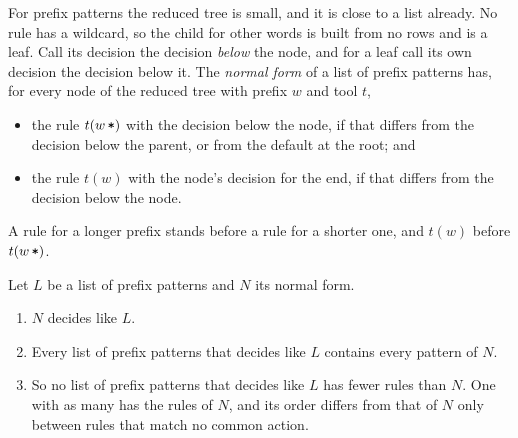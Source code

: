 \documentclass[acmsmall,nonacm,screen]{acmart}
\newcommand{\rest}{\textup{\texttt{*}}}
\begin{document}
For prefix patterns the reduced tree is small, and it is close to a list already. No rule has
a wildcard, so the child for other words is built from no rows and is a leaf. Call its
decision the decision \emph{below} the node, and for a leaf call its own decision the
decision below it. The \emph{normal form} of a list of prefix patterns has, for every node of
the reduced tree with prefix $w$ and tool $t$,
\begin{itemize}
\item the rule $t(w\,\rest)$ with the decision below the node, if that differs from the
  decision below the parent, or from the default at the root; and
\item the rule $t(w)$ with the node's decision for the end, if that differs from the decision
  below the node.
\end{itemize}
A rule for a longer prefix stands before a rule for a shorter one, and $t(w)$ before
$t(w\,\rest)$.

\begin{theorem}\label{thm:normal}
Let $L$ be a list of prefix patterns and $N$ its normal form.
\begin{enumerate}
\item $N$ decides like $L$.
\item Every list of prefix patterns that decides like $L$ contains every pattern of $N$.
\item So no list of prefix patterns that decides like $L$ has fewer rules than $N$. One with
  as many has the rules of $N$, and its order differs from that of $N$ only between rules
  that match no common action.
\end{enumerate}
\end{theorem}
\end{document}
